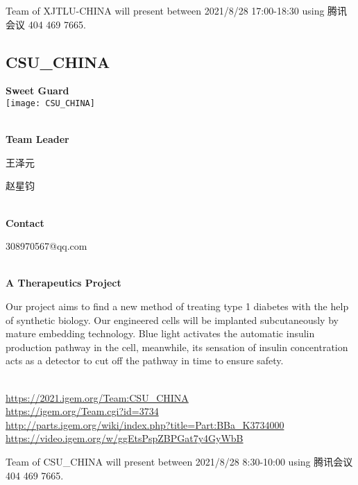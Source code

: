 \vfill{}









Team of XJTLU-CHINA will present between        2021/8/28 17:00-18:30 using 腾讯会议 404 469 7665.
\newpage


\subsection{\textcolor{Blu}{ CSU\_CHINA } }
\vspace{5mm}
\begin{center}
\large{
  \textbf{ Sweet Guard }\\
  \texttt{[image: CSU\_CHINA]}
}
\end{center}
\textbf{\\Team Leader}

  王泽元

  赵星钧


\textbf{\\Contact}

  308970567@qq.com


\textbf{\\A Therapeutics Project\\}\begin{spacing}{1.5}

Our project aims to find a new method of treating type 1 diabetes with the help of synthetic biology. Our engineered cells will be implanted subcutaneously by mature embedding technology. Blue light activates the automatic insulin production pathway in the cell, meanwhile, its sensation of insulin concentration acts as a detector to cut off the pathway in time to ensure safety.\end{spacing}
\\

\url{https://2021.igem.org/Team:CSU\_CHINA }\\
\url{https://igem.org/Team.cgi?id=3734 }\\
\url{http://parts.igem.org/wiki/index.php?title=Part:BBa_K3734000 }\\
\url{https://video.igem.org/w/ggEtsPspZBPGat7y4GyWbB }\\

\vfill{}









Team of CSU\_CHINA will present between    2021/8/28 8:30-10:00     using 腾讯会议 404 469 7665.
\newpage


